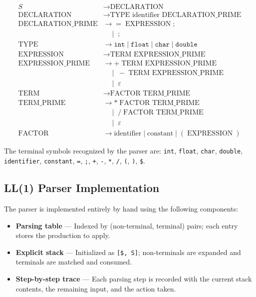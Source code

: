 \documentclass[letterpaper,12pt,oneside]{article}
\begin{document}
\begin{align*}
S &\rightarrow \text{DECLARATION} \\
\text{DECLARATION} &\rightarrow \text{TYPE identifier DECLARATION\_PRIME} \\
\text{DECLARATION\_PRIME} &\rightarrow = \;\text{EXPRESSION}\;; \\
                          &\quad\mid\; ; \\
\text{TYPE} &\rightarrow \texttt{int} \mid \texttt{float} \mid \texttt{char} \mid \texttt{double} \\
\text{EXPRESSION} &\rightarrow \text{TERM EXPRESSION\_PRIME} \\
\text{EXPRESSION\_PRIME} &\rightarrow +\;\text{TERM EXPRESSION\_PRIME} \\
                         &\quad\mid\; -\;\text{TERM EXPRESSION\_PRIME} \\
                         &\quad\mid\; \varepsilon \\
\text{TERM} &\rightarrow \text{FACTOR TERM\_PRIME} \\
\text{TERM\_PRIME} &\rightarrow *\;\text{FACTOR TERM\_PRIME} \\
                   &\quad\mid\; /\;\text{FACTOR TERM\_PRIME} \\
                   &\quad\mid\; \varepsilon \\
\text{FACTOR} &\rightarrow \text{identifier} \mid \text{constant} \mid (\;\text{EXPRESSION}\;)
\end{align*}

The terminal symbols recognized by the parser are:
\texttt{int}, \texttt{float}, \texttt{char}, \texttt{double}, \texttt{identifier},
\texttt{constant}, \texttt{=}, \texttt{;}, \texttt{+}, \texttt{-}, \texttt{*},
\texttt{/}, \texttt{(}, \texttt{)}, \texttt{\$}.

\subsection{LL(1) Parser Implementation}

The parser is implemented entirely by hand using the following components:

\begin{itemize}
    \item \textbf{Parsing table} — Indexed by (non-terminal, terminal) pairs; each
          entry stores the production to apply.
    \item \textbf{Explicit stack} — Initialized as \texttt{[\$, S]}; non-terminals
          are expanded and terminals are matched and consumed.
    \item \textbf{Step-by-step trace} — Each parsing step is recorded with the current
          stack contents, the remaining input, and the action taken.
\end{itemize}
\end{document}
